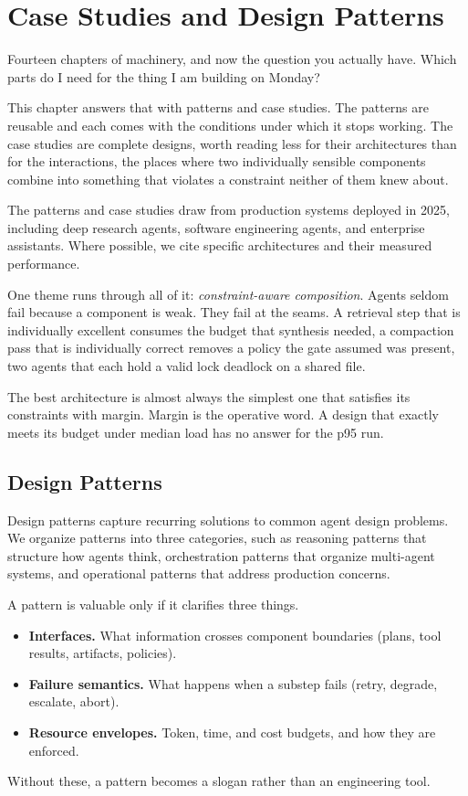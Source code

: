 \chapter{Case Studies and Design Patterns}
\label{ch:patterns}

Fourteen chapters of machinery, and now the question you actually have. Which
parts do I need for the thing I am building on Monday?

This chapter answers that with patterns and case studies. The patterns are
reusable and each comes with the conditions under which it stops working. The case
studies are complete designs, worth reading less for their architectures than for
the interactions, the places where two individually sensible components combine
into something that violates a constraint neither of them knew about.

The patterns and case studies draw from production systems deployed in 2025, including deep research agents, software engineering agents, and enterprise assistants. Where possible, we cite specific architectures and their measured performance.

One theme runs through all of it: \textit{constraint-aware composition}. Agents
seldom fail because a component is weak. They fail at the seams. A retrieval
step that is individually excellent consumes the budget that synthesis needed, a
compaction pass that is individually correct removes a policy the gate assumed
was present, two agents that each hold a valid lock deadlock on a shared file.

The best architecture is almost always the simplest one that satisfies its
constraints with margin. Margin is the operative word. A design that exactly meets
its budget under median load has no answer for the p95 run.

\section{Design Patterns}

Design patterns capture recurring solutions to common agent design problems. We organize patterns into three categories, such as reasoning patterns that structure how agents think, orchestration patterns that organize multi-agent systems, and operational patterns that address production concerns.

A pattern is valuable only if it clarifies three things.
\begin{itemize}
\item \textbf{Interfaces.} What information crosses component boundaries (plans, tool results, artifacts, policies).
\item \textbf{Failure semantics.} What happens when a substep fails (retry, degrade, escalate, abort).
\item \textbf{Resource envelopes.} Token, time, and cost budgets, and how they are enforced.
\end{itemize}
Without these, a pattern becomes a slogan rather than an engineering tool.

